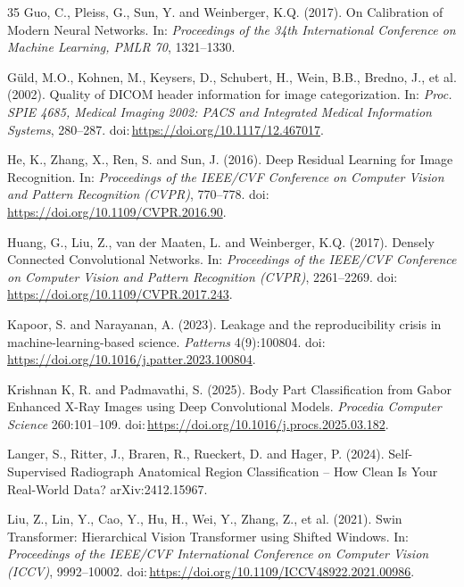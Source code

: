 \begin{thebibliography}{35}
Guo, C., Pleiss, G., Sun, Y. and Weinberger, K.Q. (2017). On Calibration of Modern Neural Networks. In: \textit{Proceedings of the 34th International Conference on Machine Learning, PMLR 70}, 1321--1330.

G{\"u}ld, M.O., Kohnen, M., Keysers, D., Schubert, H., Wein, B.B., Bredno, J., et al. (2002). Quality of DICOM header information for image categorization. In: \textit{Proc. SPIE 4685, Medical Imaging 2002: PACS and Integrated Medical Information Systems}, 280--287. doi:\,\url{https://doi.org/10.1117/12.467017}.

He, K., Zhang, X., Ren, S. and Sun, J. (2016). Deep Residual Learning for Image Recognition. In: \textit{Proceedings of the IEEE/CVF Conference on Computer Vision and Pattern Recognition (CVPR)}, 770--778. doi:\,\url{https://doi.org/10.1109/CVPR.2016.90}.

Huang, G., Liu, Z., van der Maaten, L. and Weinberger, K.Q. (2017). Densely Connected Convolutional Networks. In: \textit{Proceedings of the IEEE/CVF Conference on Computer Vision and Pattern Recognition (CVPR)}, 2261--2269. doi:\,\url{https://doi.org/10.1109/CVPR.2017.243}.

Kapoor, S. and Narayanan, A. (2023). Leakage and the reproducibility crisis in machine-learning-based science. \textit{Patterns} 4(9):100804. doi:\,\url{https://doi.org/10.1016/j.patter.2023.100804}.

Krishnan K, R. and Padmavathi, S. (2025). Body Part Classification from Gabor Enhanced X-Ray Images using Deep Convolutional Models. \textit{Procedia Computer Science} 260:101--109. doi:\,\url{https://doi.org/10.1016/j.procs.2025.03.182}.

Langer, S., Ritter, J., Braren, R., Rueckert, D. and Hager, P. (2024). Self-Supervised Radiograph Anatomical Region Classification -- How Clean Is Your Real-World Data? arXiv:2412.15967.

Liu, Z., Lin, Y., Cao, Y., Hu, H., Wei, Y., Zhang, Z., et al. (2021). Swin Transformer: Hierarchical Vision Transformer using Shifted Windows. In: \textit{Proceedings of the IEEE/CVF International Conference on Computer Vision (ICCV)}, 9992--10002. doi:\,\url{https://doi.org/10.1109/ICCV48922.2021.00986}.


\end{thebibliography}
